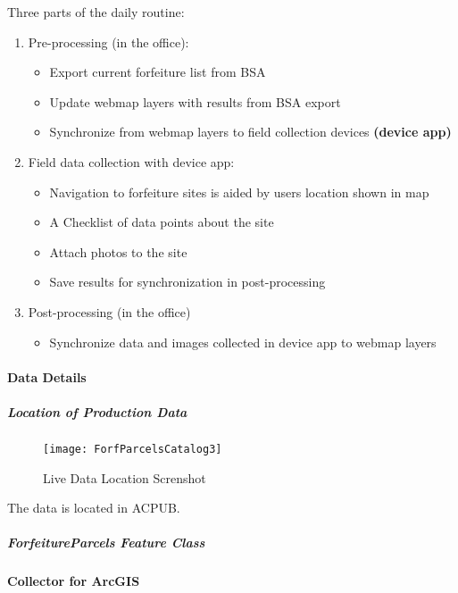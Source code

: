 \documentclass[class=article , crop=false, titlepage, twoside, multi={itemize, figure, verbatim}, float=false]{standalone}
\begin{document}
Three parts of the daily routine:
\begin{enumerate}
\item Pre-processing (in the office):

\begin{itemize}
\item Export current forfeiture list from BSA
\item Update webmap layers with results from BSA export
\item Synchronize from webmap layers to field collection devices \textbf{(device app)}
\end{itemize}

\item Field data collection with device app:

\begin{itemize}
\item Navigation to forfeiture sites is aided by users location shown in map
\item A Checklist of data points about the site
\item Attach photos to the site
\item Save results for synchronization in post-processing
\end{itemize}

\item Post-processing (in the office)

\begin{itemize}
\item Synchronize data and images collected in device app to webmap layers

\end{itemize}
\end{enumerate}

\paragraph{Data Details}
\subparagraph{Location of Production Data}
\begin{wrapfigure}{r}{0.5\textwidth}
\centering
\texttt{[image: ForfParcelsCatalog3]}
\caption{Live Data Location Screnshot}
\end{wrapfigure}
The data is located in ACPUB.
\clearpage

\subparagraph{ForfeitureParcels Feature Class}

\paragraph{Collector for ArcGIS}
\end{document}
